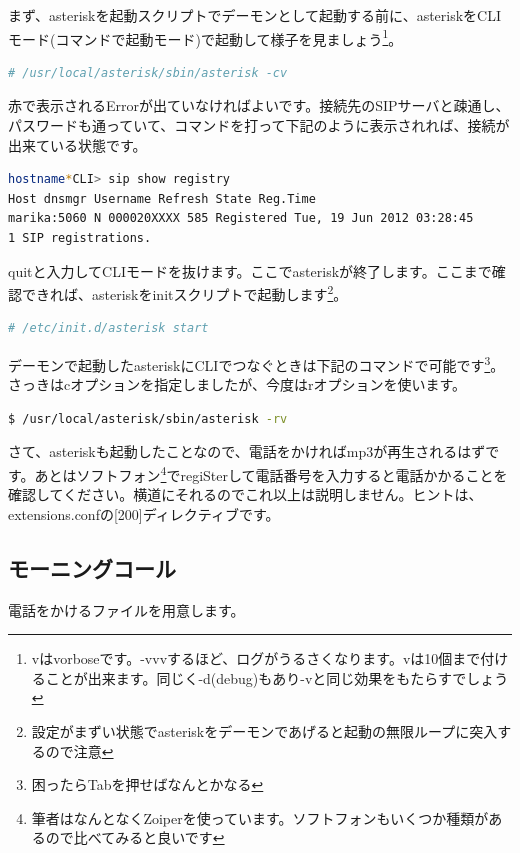 まず、asteriskを起動スクリプトでデーモンとして起動する前に、asteriskをCLIモード(コマンドで起動モード)で起動して様子を見ましょう\footnote{vはvorboseです。-vvvするほど、ログがうるさくなります。vは10個まで付けることが出来ます。同じく-d(debug)もあり-vと同じ効果をもたらすでしょう}。

\begin{lstlisting}[language=bash]
# /usr/local/asterisk/sbin/asterisk -cv
\end{lstlisting}

赤で表示されるErrorが出ていなければよいです。接続先のSIPサーバと疎通し、パスワードも通っていて、コマンドを打って下記のように表示されれば、接続が出来ている状態です。

\begin{lstlisting}[language=bash]
hostname*CLI> sip show registry 
Host dnsmgr Username Refresh State Reg.Time 
marika:5060 N 000020XXXX 585 Registered Tue, 19 Jun 2012 03:28:45
1 SIP registrations. 
\end{lstlisting}

quitと入力してCLIモードを抜けます。ここでasteriskが終了します。ここまで確認できれば、asteriskをinitスクリプトで起動します\footnote{設定がまずい状態でasteriskをデーモンであげると起動の無限ループに突入するので注意}。

\begin{lstlisting}[language=bash]
# /etc/init.d/asterisk start
\end{lstlisting}

デーモンで起動したasteriskにCLIでつなぐときは下記のコマンドで可能です\footnote{困ったらTabを押せばなんとかなる}。さっきはcオプションを指定しましたが、今度はrオプションを使います。

\begin{lstlisting}[language=bash]
$ /usr/local/asterisk/sbin/asterisk -rv
\end{lstlisting}

さて、asteriskも起動したことなので、電話をかければmp3が再生されるはずです。あとはソフトフォン\footnote{筆者はなんとなくZoiperを使っています。ソフトフォンもいくつか種類があるので比べてみると良いです}でregiSterして電話番号を入力すると電話かかることを確認してください。横道にそれるのでこれ以上は説明しません。ヒントは、extensions.confの[200]ディレクティブです。

\subsection{モーニングコール}
電話をかけるファイルを用意します。

